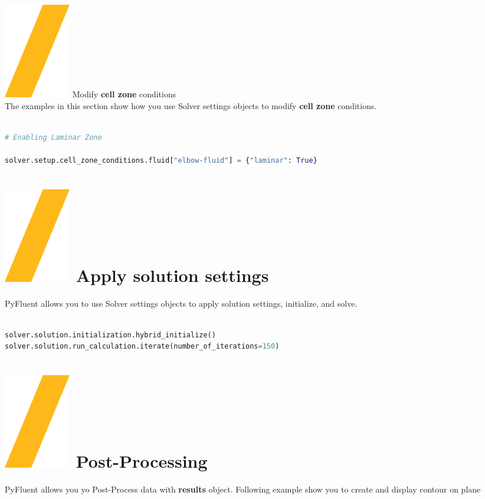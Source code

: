 \documentclass[9pt,landscape]{article}
\begin{document}
\begin{multicols}{3}
{\vfill
{\includegraphics[height=\fontcharht\font`\S]{slash.png}  Modify \textbf{cell zone} conditions} \\
The examples in this section show how you use Solver settings objects to modify \textbf{cell zone} conditions.
\begin{lstlisting}[language=Python]

# Enabling Laminar Zone

solver.setup.cell_zone_conditions.fluid["elbow-fluid"] = {"laminar": True}  


\end{lstlisting}
\vfill

\vfill
\section{\includegraphics[height=\fontcharht\font`\S]{slash.png}  Apply solution settings}
PyFluent allows you to use Solver settings objects to apply
solution settings, initialize, and solve.

\begin{lstlisting}[language=Python]

solver.solution.initialization.hybrid_initialize()
solver.solution.run_calculation.iterate(number_of_iterations=150)

\end{lstlisting}

\section{\includegraphics[height=\fontcharht\font`\S]{slash.png}  Post-Processing}
PyFluent allows you yo Post-Process data with \textbf{results} object. Following example show you to create and display contour on plane

}
\end{multicols}
\end{document}
